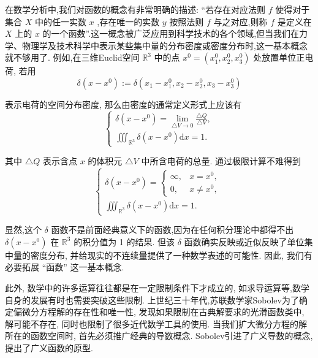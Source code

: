 \documentclass[lang=cn,newtx,10pt,scheme=chinese,thmcnt=chapter]{elegantbook}
\newcommand{\dif}{\mathrm{d}}
\begin{document}
在数学分析中,我们对函数的概念有非常明确的描述: “若存在对应法则 \(f\) 使得对于集合 \(X\) 中的任一实数 \(x\) ,存在唯一的实数 \(y\) 按照法则 \(f\) 与之对应,则称 \(f\) 是定义在 \(X\) 上的 \(x\) 的一个函数”.这一概念被广泛应用到科学技术的各个领域,但当我们在力学、物理学及技术科学中表示某些集中量的分布密度或密度分布时,这一基本概念就不够用了. 例如,在三维Euclid空间 \({\mathbb{R}}^{3}\) 中的点 \({x}^{0} = \left( {{x}_{1}^{0},{x}_{2}^{0},{x}_{3}^{0}}\right)\) 处放置单位正电荷, 若用
\begin{equation*}
\delta \left( {x - {x}^{0}}\right)  \mathrel{\text{ := }} \delta \left( {{x}_{1} - {x}_{1}^{0},{x}_{2} - {x}_{2}^{0},{x}_{3} - {x}_{3}^{0}}\right)
\end{equation*}

表示电荷的空间分布密度, 那么由密度的通常定义形式上应该有
\begin{equation*}
\left\{  \begin{array}{l} \delta \left( {x - {x}^{0}}\right)  = \mathop{\lim }\limits_{{\bigtriangleup V \rightarrow  0}}\frac{\bigtriangleup Q}{\bigtriangleup V}, \\   {\iiint }_{{\mathbb{R}}^{3}}\delta \left( {x - {x}^{0}}\right) {\dif x} = 1. \end{array}\right.
\end{equation*}

其中 \(\bigtriangleup Q\) 表示含点 \(x\) 的体积元 \(\bigtriangleup V\) 中所含电荷的总量. 通过极限计算不难得到
\begin{equation*}
\left\{  \begin{array}{l} \delta \left( {x - {x}^{0}}\right)  = \left\{  \begin{matrix} \infty , & x = {x}^{0}, \\  0, & x \neq  {x}^{0}, \end{matrix}\right. \\   {\iiint }_{{\mathbb{R}}^{3}}\delta \left( {x - {x}^{0}}\right) {\dif x} = 1. \end{array}\right.
\end{equation*}

显然,这个 \(\delta\) 函数不是前面经典意义下的函数,因为在任何积分理论中都得不出 \(\delta \left( {x - {x}^{0}}\right)\) 在 \({\mathbb{R}}^{3}\) 的积分值为 1 的结果. 但该 \(\delta\) 函数确实反映或近似反映了单位集中量的密度分布, 并给现实的不连续量提供了一种数学表述的可能性. 因此, 我们有必要拓展 “函数” 这一基本概念.

此外, 数学中的许多运算往往都是在一定限制条件下才成立的, 如求导运算等,数学自身的发展有时也需要突破这些限制. 上世纪三十年代,苏联数学家Sobolev为了确定偏微分方程解的存在性和唯一性, 发现如果限制在古典解要求的光滑函数类中, 解可能不存在, 同时也限制了很多近代数学工具的使用. 当我们扩大微分方程的解所在的函数空间时, 首先必须推广经典的导数概念. Sobolev引进了广义导数的概念, 提出了广义函数的原型.
\end{document}
